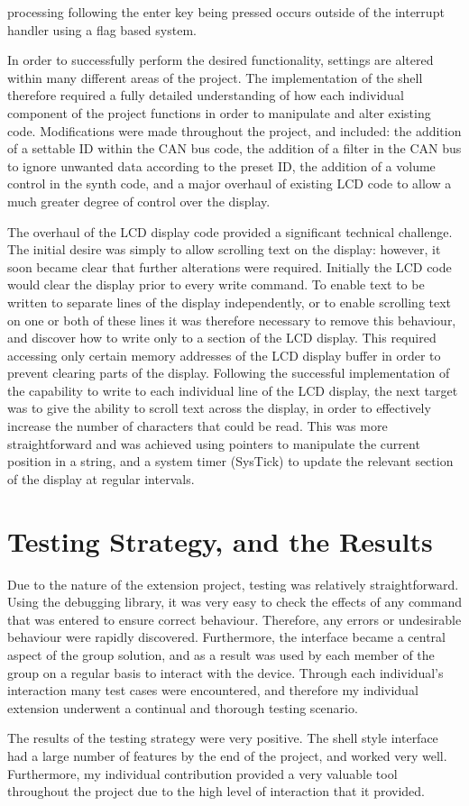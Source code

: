 processing following the enter key being pressed occurs outside of the interrupt 
handler using a flag based system.
\par\bigskip\noindent
In order to successfully perform the desired functionality, settings are altered 
within many different areas of the project. The implementation of the shell 
therefore required a fully detailed understanding of how each individual 
component of the project functions in order to manipulate and alter existing 
code. Modifications were made throughout the project, and included: the addition 
of a settable ID within the CAN bus code, the addition of a filter in the CAN 
bus to ignore unwanted data according to the preset ID, the addition of a 
volume control in the synth code, and a major overhaul of existing LCD code to 
allow a much greater degree of control over the display. 
\par\bigskip\noindent
The overhaul of the LCD display code provided a significant technical challenge. 
The initial desire was simply to allow scrolling text on the display: however, 
it soon became clear that further alterations were required. Initially the LCD 
code would clear the display prior to every write command. To enable text to be 
written to separate lines of the display independently, or to enable scrolling 
text on one or both of these lines it was therefore necessary to remove this 
behaviour, and discover how to write only to a section of the LCD display. 
This required accessing only certain memory addresses of the LCD display buffer 
in order to prevent clearing parts of the display. Following the successful 
implementation of the capability to write to each individual line of the LCD 
display, the next target was to give the ability to scroll text across the 
display, in order to effectively increase the number of characters that could 
be read. This was more straightforward and was achieved using pointers to 
manipulate the current position in a string, and a system timer (SysTick) to 
update the relevant section of the display at regular intervals.

\section{Testing Strategy, and the Results}

Due to the nature of the extension project, testing was relatively straightforward. 
Using the debugging library, it was very easy to check the effects of any command 
that was entered to ensure correct behaviour. Therefore, any errors or undesirable 
behaviour were rapidly discovered. Furthermore, the interface became a central 
aspect of the group solution, and as a result was used by each member of the 
group on a regular basis to interact with the device. Through each individual's
interaction many test cases were encountered, and therefore my individual extension 
underwent a continual and thorough testing scenario. 
\par\bigskip\noindent
The results of the testing strategy were very positive. The shell style interface 
had a large number of features by the end of the project, and worked very well. 
Furthermore, my individual contribution provided a very valuable tool throughout 
the project due to the high level of interaction that it provided. 
